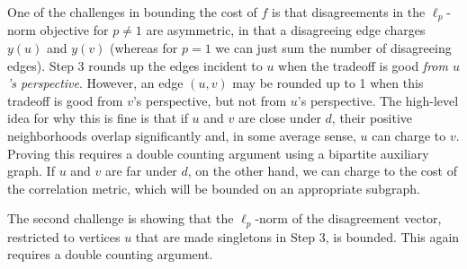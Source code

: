 \documentclass[11pt]{article}
\begin{document}
One of the challenges in bounding the cost of $f$ is that disagreements in the $\ell_p$-norm objective for $p \neq 1$ are asymmetric, in that a disagreeing edge charges $y(u)$ and $y(v)$ (whereas for $p=1$ we can just sum the number of disagreeing edges). Step 3 rounds up the edges incident to $u$ when the tradeoff is good \textit{from $u$'s perspective}. However, an edge $(u,v)$ may be rounded up to 1 when this tradeoff is good from $v$'s perspective, but not from $u$'s perspective. The high-level idea for why this is fine is that if $u$ and $v$ are close under $d$, their positive neighborhoods overlap significantly and, in some average sense, $u$ can charge to $v$. Proving this requires a double counting argument using a bipartite auxiliary graph. If $u$ and $v$ are far under $d$, on the other hand, we can charge to the cost of the correlation metric, which will be bounded on an appropriate subgraph.

The second challenge is showing that the $\ell_p$-norm of the disagreement vector, restricted to vertices $u$ that are made singletons in Step 3, is bounded. This again requires a double counting argument.
\end{document}
